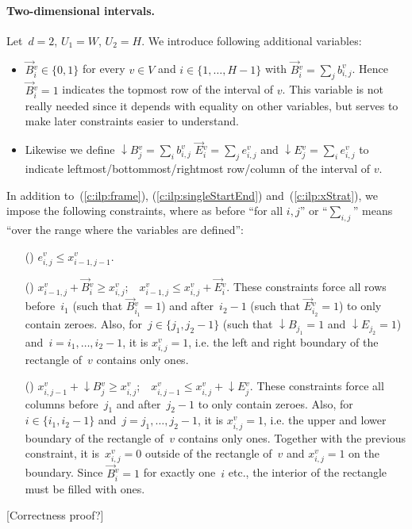 \documentclass[runningheads]{llncs}
\newcommand{\rowsum}[1]{{\overset{\rightarrow}{#1}}}
\newcommand{\columnsum}[1]{{\downarrow\!#1}}
\newcounter{constr}
\newcommand{\constr}[1]{\noindent \refstepcounter{constr}\theconstr #1}
\begin{document}
\paragraph*{Two-dimensional intervals.}
Let~$d=2$, $U_1 = W$, $U_2 = H$.
We introduce following additional variables:
\begin{itemize}
\item $\rowsum{B}{_i^v}\in \{0,1\}$ for every $v\in V$ and $i\in \{1,\dots,H-1\}$	
	with $\rowsum{B}{_i^v} = \sum_j b_{i,j}^v$.  Hence
	$\rowsum{B}{_i^v} = 1$ indicates the topmost row of the interval
	of $v$.  This variable is not really needed since it 
	depends with equality on other variables,
	but serves to make later constraints easier to understand.
\item Likewise we define
	$\columnsum{B}{_j^v} = \sum_i b_{i,j}^v$
	$\rowsum{E}{_i^v} = \sum_j e_{i,j}^v$ and
	$\columnsum{E}{_j^v} = \sum_i e_{i,j}^v$
	to indicate leftmost/bottommost/rightmost row/column of the interval
	of $v$.
\end{itemize}
In addition to~(\ref{c:ilp:frame}), (\ref{c:ilp:singleStartEnd})
and~(\ref{c:ilp:xStrat}),
we impose the following constraints, where as before ``for all $i,j$''
or ``$\sum_{i,j}$'' means ``over the range where the variables are defined'':
\begin{itemize}
\item[(\constr{\label{c:ilp:2dim:xEnd}})] 
	 $e_{i,j}^v\leq x_{i-1,j-1}^v$.
\item[(\constr{\label{c:ilp:2dim:rows}})] 
	 $x_{i-1,j}^v + \rowsum{B}{_i^v} \geq x_{i,j}^v$;~~$x_{i-1,j}^v \leq x_{i,j}^v + \rowsum{E}{_i^v}$.
These constraints force all rows before~$i_1$ 
(such that $\rowsum{B}{_{i_1}^v} = 1$)
and after~$i_2-1$ 
(such that $\rowsum{E}{_{i_2}^v} = 1$)
to only contain zeroes.
Also, for~$j \in \{ j_1, j_2-1\}$ 
(such that $\columnsum{B}_{j_1} = 1$ and $\columnsum{E}_{j_2}=1$)
and~$i = i_1, \ldots, i_2 - 1$,
it is $x_{i,j}^v = 1$, i.e. the left and right boundary of the rectangle of~$v$
contains only ones.
\item[(\constr{\label{c:ilp:2dim:cols}})] 
	 $x_{i,j-1}^v + \columnsum{B}{_j^v} \geq x_{i,j}^v$;~~$x_{i,j-1}^v \leq x_{i,j}^v + \columnsum{E}{_j^v}$.
These constraints force all columns before~$j_1$ 
and after~$j_2-1$ to only contain zeroes.
Also, for~$i \in \{ i_1, i_2-1\}$ 
and~$j = j_1, \ldots, j_2 - 1$,
it is $x_{i,j}^v = 1$, i.e. the upper and lower boundary of the rectangle of~$v$
contains only ones.
Together with the previous constraint, it is~$x_{i,j}^v = 0$ outside of the rectangle of~$v$
and $x_{i,j}^v = 1$ on the boundary.
Since $\rowsum{B}{_{i}^v} = 1$ for exactly one~$i$ etc.,
the interior of the rectangle must be filled with ones.
\end{itemize}
[Correctness proof?]
\end{document}

